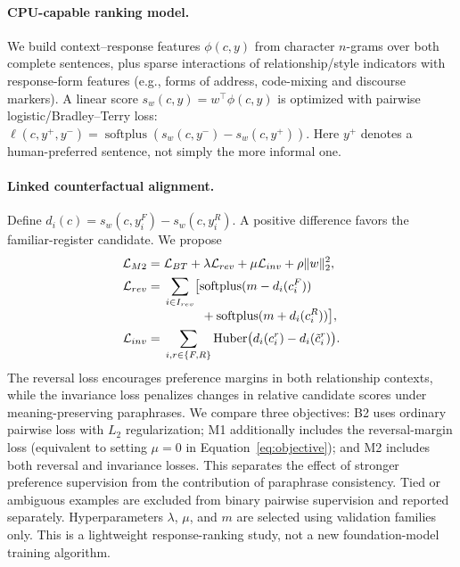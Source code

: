 \documentclass[11pt]{article}
\begin{document}
\paragraph{CPU-capable ranking model.}
We build context--response features $\phi(c,y)$ from character $n$-grams over both complete sentences, plus sparse interactions of relationship/style indicators with response-form features (e.g., forms of address, code-mixing and discourse markers). A linear score $s_w(c,y)=w^\top\phi(c,y)$ is optimized with pairwise logistic/Bradley--Terry loss: $\ell(c,y^+,y^-)=\operatorname{softplus}(s_w(c,y^-)-s_w(c,y^+))$. Here $y^+$ denotes a human-preferred sentence, not simply the more informal one.

\paragraph{Linked counterfactual alignment.}
Define $d_i(c)=s_w(c,y_i^F)-s_w(c,y_i^R)$. A positive difference favors the familiar-register candidate. We propose
\begin{align}
\mathcal L_{M2}={}&\mathcal L_{BT}+\lambda\mathcal L_{rev}
 +\mu\mathcal L_{inv}+\rho\lVert w\rVert_2^2,\label{eq:objective}\\
\mathcal L_{rev}={}&\sum_{i\in I_{rev}} \bigl[\operatorname{softplus}(m-d_i(c_i^F))\notag\\[-3pt]
 &\qquad\quad+\operatorname{softplus}(m+d_i(c_i^R))\bigr],\\
\mathcal L_{inv}={}&\sum_{i,r\in\{F,R\}}\operatorname{Huber}\bigl(d_i(c_i^r)-d_i(\tilde c_i^r)\bigr).
\end{align}
The reversal loss encourages preference margins in both relationship contexts, while the invariance loss penalizes changes in relative candidate scores under meaning-preserving paraphrases. We compare three objectives: B2 uses ordinary pairwise loss with $L_2$ regularization; M1 additionally includes the reversal-margin loss (equivalent to setting $\mu=0$ in Equation~\ref{eq:objective}); and M2 includes both reversal and invariance losses. This separates the effect of stronger preference supervision from the contribution of paraphrase consistency. Tied or ambiguous examples are excluded from binary pairwise supervision and reported separately. Hyperparameters $\lambda$, $\mu$, and $m$ are selected using validation families only. This is a lightweight response-ranking study, not a new foundation-model training algorithm.
\end{document}
